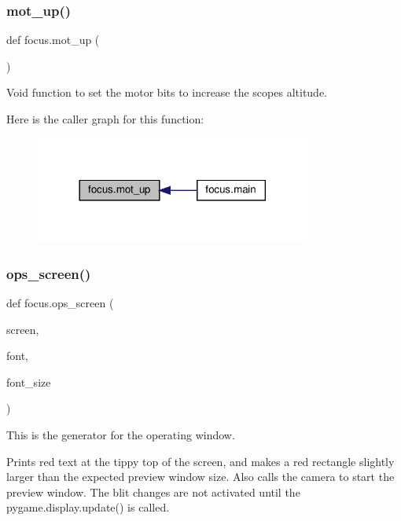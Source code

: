 \subsubsection{\texorpdfstring{mot\+\_\+up()}{mot\_up()}}
{\footnotesize\ttfamily def focus.\+mot\+\_\+up (\begin{DoxyParamCaption}{ }\end{DoxyParamCaption})}



Void function to set the motor bits to increase the scope\textquotesingle{}s altitude. 

Here is the caller graph for this function\+:
\nopagebreak
\begin{figure}[H]
\begin{center}
\leavevmode
\includegraphics[width=257pt]{namespacefocus_ad0102bfe821a43392640e33721246a8c_icgraph}
\end{center}
\end{figure}
\mbox{\label{namespacefocus_a30f8dfb1f7d958ee49491a2e359ea3e2}} 
\subsubsection{\texorpdfstring{ops\+\_\+screen()}{ops\_screen()}}
{\footnotesize\ttfamily def focus.\+ops\+\_\+screen (\begin{DoxyParamCaption}\item[{}]{screen,  }\item[{}]{font,  }\item[{}]{font\+\_\+size }\end{DoxyParamCaption})}



This is the generator for the operating window. 

Prints red text at the tippy top of the screen, and makes a red rectangle slightly larger than the expected preview window size. Also calls the camera to start the preview window. The blit changes are not activated until the pygame.\+display.\+update() is called.


